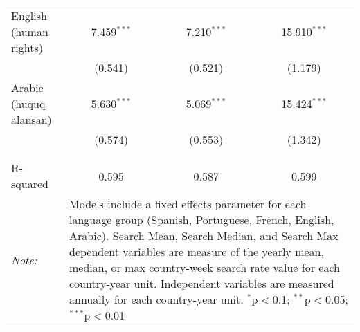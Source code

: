 \begin{table}[!htbp]
\begin{tabular}{@{\extracolsep{5pt}}lccc}
  English (human rights) & 7.459$^{***}$ & 7.210$^{***}$ & 15.910$^{***}$ \\ 
  & (0.541) & (0.521) & (1.179) \\ 
  Arabic (huquq alansan) & 5.630$^{***}$ & 5.069$^{***}$ & 15.424$^{***}$ \\ 
  & (0.574) & (0.553) & (1.342) \\ 
 \hline \\[-1.8ex] 
\hline 
\hline \\[-1.8ex] 
R-squared  & 0.595 & 0.587 & 0.599 \\ 
\textit{Note:}  & \multicolumn{3}{l}{\parbox[t]{8cm}{Models include a fixed effects parameter for each language group (Spanish, Portuguese, French, English, Arabic). Search Mean, Search Median, and Search Max dependent variables are measure of the yearly mean, median, or max country-week search rate value for each country-year unit. Independent variables are measured annually for each country-year unit. $^{*}$p$<$0.1; $^{**}$p$<$0.05; $^{***}$p$<$0.01}} \\ 
\end{tabular} 
\end{table} 
